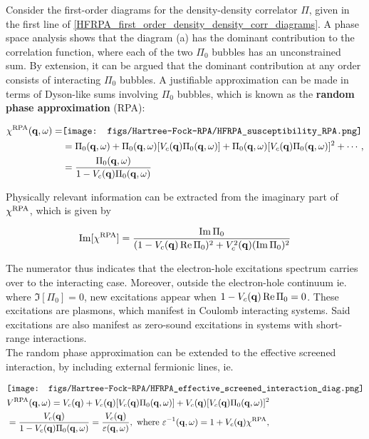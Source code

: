{Consider the first-order diagrams for the density-density correlator $\Pi$, given in the first line of \cref{HFRPA_first_order_density_density_corr_diagrams}. A phase space analysis shows that the diagram (a) has the dominant contribution to the correlation function, where each of the two $\Pi_0$ bubbles has an unconstrained sum. By extension, it can be argued that the dominant contribution at any order consists of interacting $\Pi_0$ bubbles. A justifiable approximation can be made in terms of Dyson-like sums involving $\Pi_0$ bubbles, which is known as the \textbf{random phase approximation} (RPA)}:

\begin{equation}
    \begin{split}
        \chi^{\textnormal{RPA}}({\bf q}, \omega) =& 
\texttt{[image: figs/Hartree-Fock-RPA/HFRPA\_susceptibility\_RPA.png]} \\
    &= \Pi_0({\bf q}, \omega) + \Pi_0({\bf q}, \omega) [V_c({\bf q}) \Pi_0({\bf q}, \omega)] + \Pi_0({\bf q}, \omega) [V_c({\bf q}) \Pi_0({\bf q}, \omega)]^2 + \cdots, \\
    &= \frac{\Pi_0({\bf q}, \omega)}{1- V_{c}({\bf q}) \Pi_0({\bf q}, \omega)}
    \end{split}
\end{equation}

Physically relevant information can be extracted from the imaginary part of $\chi^{\textnormal{RPA}}$, which is given by 

\begin{equation}
    \Im[\chi^{\textnormal{RPA}}] = \frac{\Im \Pi_0}{(1 - V_c({\bf q}) \Re \Pi_0)^2 + V_c^2({\bf q}) (\Im \Pi_0)^2}
\end{equation}

The numerator thus indicates that the electron-hole excitations spectrum carries over to the interacting case. Moreover, outside the electron-hole continuum ie. where $\Im[\Pi_0] = 0$, new excitations appear when $1 - V_c({\bf q}) \Re \Pi_0 = 0$.
These excitations are plasmons, which manifest in Coulomb interacting systems. Said excitations are also manifest as zero-sound excitations in systems with short-range interactions. \\

The random phase approximation can be extended to the effective screened interaction, by including external fermionic lines, ie.

\begin{equation}
    \begin{split}
        &\texttt{[image: figs/Hartree-Fock-RPA/HFRPA\_effective\_screened\_interaction\_diag.png]} \\
        & V^{\textnormal{RPA}}({\bf q}, \omega) = V_c({\bf q}) + V_c({\bf q}) [V_c({\bf q}) \Pi_0 ({\bf q}, \omega)] + V_c({\bf q}) [V_c({\bf q}) \Pi_0 ({\bf q}, \omega)]^2 \\
        &= \frac{V_c({\bf q})}{1-V_c({\bf q}) \Pi_0({\bf q}, \omega)} = \frac{V_c({\bf q})}{\varepsilon({\bf q}, \omega)}, \textnormal{ where } \varepsilon^{-1}({\bf q}, \omega) = 1 + V_c({\bf q}) \chi^{\textnormal{RPA}},
    \end{split}
\end{equation}

